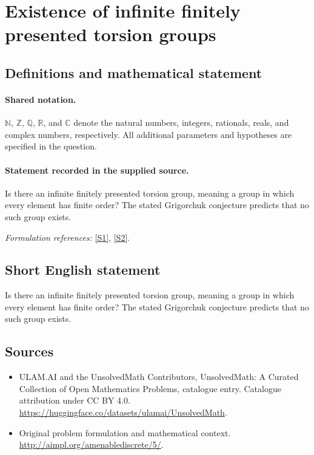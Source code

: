 \documentclass[11pt]{article}
\newcommand{\sref}[2]{\hyperlink{source:#1:#2}{[S#2]}}
\begin{document}
\section{Existence of infinite finitely presented torsion groups}\label{statement}

\subsection{Definitions and mathematical statement}

\paragraph{Shared notation.}$\mathbb N$, $\mathbb Z$, $\mathbb Q$, $\mathbb R$, and $\mathbb C$ denote the natural numbers, integers, rationals, reals, and complex numbers, respectively. All additional parameters and hypotheses are specified in the question.


\paragraph{Statement recorded in the supplied source.}
Is there an infinite finitely presented torsion group, meaning a group in which every element has finite order? The stated Grigorchuk conjecture predicts that no such group exists.
\par\smallskip\textit{Formulation references:} \sref{statement}{1}, \sref{statement}{2}.
\subsection{Short English statement}
Is there an infinite finitely presented torsion group, meaning a group in which every element has finite order? The stated Grigorchuk conjecture predicts that no such group exists.
\subsection{Sources}
\begin{itemize}
\item[\hypertarget{source:statement:1}{S1}] ULAM.AI and the UnsolvedMath Contributors, UnsolvedMath: A Curated Collection of Open Mathematics Problems, catalogue entry. Catalogue attribution under CC BY 4.0.
\url{https://huggingface.co/datasets/ulamai/UnsolvedMath}.
\item[\hypertarget{source:statement:2}{S2}] Original problem formulation and mathematical context.
\url{http://aimpl.org/amenablediscrete/5/}.
\end{itemize}
\label{end:statement}
\end{document}
